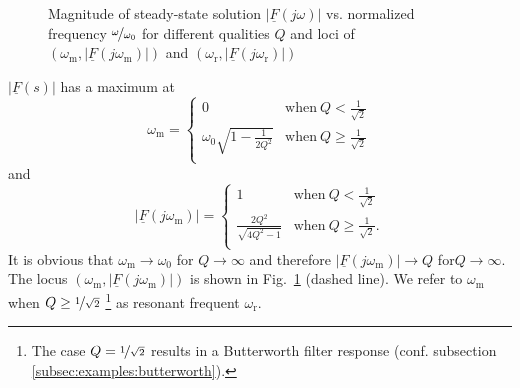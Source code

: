 \documentclass{article}[11pt]
\begin{document}
\begin{figure}[H]
  \caption{Magnitude of steady-state solution 
    $\left|\underline{F}(j\omega)\right|$ vs. normalized 
    frequency $\nicefrac{\omega}{\omega_0}$ for different qualities $Q$ and loci 
    of $(\omega_{\mathrm{m}}, \left|\underline{F}(j\omega_{\mathrm{m}})\right|)$
    and $(\omega_{\mathrm{r}}, \left|\underline{F}(j\omega_{\mathrm{r}})\right|)$}
  \label{fig:plot-fs}
\end{figure}

$\left|\underline{F}(s)\right|$ has a maximum at 
\begin{equation}
\omega_{\mathrm{m}}=
\begin{cases}
0 & \mathrm{when} \ Q <\frac{1}{\sqrt{2}} \\
\omega_0 \sqrt{1-\frac{1}{2Q^2}} & \mathrm{when} \ Q\geq\frac{1}{\sqrt{2}} \\
\end{cases} 
\end{equation}
and
\begin{equation}
\left|\underline{F}(j\omega_{\mathrm{m}})\right| =
\begin{cases}
1 & \mathrm{when} \ Q <\frac{1}{\sqrt{2}} \\
\frac{2 Q^2}{\sqrt{4Q^2-1}} & \mathrm{when} \ Q\geq\frac{1}{\sqrt{2}}. \\
\end{cases} 
\end{equation}
It is obvious that  $\omega_{\mathrm{m}} \rightarrow \omega_{\mathrm{0}}$
for $Q \rightarrow \infty$ and therefore 
$\left|\underline{F}(j\omega_{\mathrm{m}})\right| \rightarrow  Q$
for$Q \rightarrow \infty$.
The locus $(\omega_{\mathrm{m}}, \left|\underline{F}(j\omega_{\mathrm{m}})\right|)$
is shown in Fig.~\ref{fig:plot-fs} (dashed line).
We refer to $\omega_{\mathrm{m}}$ when $Q\geq\nicefrac{1}{\sqrt{2}}$%
\footnote{The case $Q = \nicefrac{1}{\sqrt{2}}$  results
in a Butterworth filter response 
(conf. subsection \ref{subsec:examples:butterworth}).}
as resonant frequent $\omega_{\mathrm{r}}$.
\end{document}
